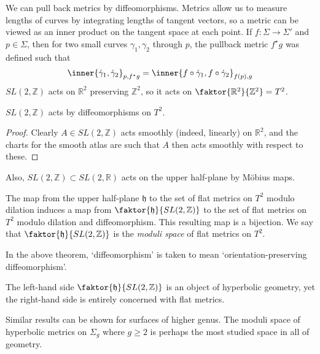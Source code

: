We can pull back metrics by diffeomorphisms.
Metrics allow us to measure lengths of curves by integrating lengths of tangent vectors, so a metric can be viewed as an inner product on the tangent space at each point.
If $f \colon \Sigma \to \Sigma'$ and $p \in \Sigma$, then for two small curves $\gamma_1, \gamma_2$ through $p$, the pullback metric $f^\star g$ was defined such that
\begin{align*}
	\inner{\dot \gamma_1, \dot \gamma_2}_{p, f^\star g} = \inner{f \circ \dot \gamma_1, f \circ \dot \gamma_2}_{f(p), g}
\end{align*}
$SL(2,\mathbb Z)$ acts on $\mathbb R^2$ preserving $\mathbb Z^2$, so it acts on $\faktor{\mathbb R^2}{\mathbb Z^2} = T^2$.
\begin{lemma}
	$SL(2,\mathbb Z)$ acts by diffeomorphisms on $T^2$.
\end{lemma}
\begin{proof}
	Clearly $A \in SL(2,\mathbb Z)$ acts smoothly (indeed, linearly) on $\mathbb R^2$, and the charts for the smooth atlas are such that $A$ then acts smoothly with respect to these.
\end{proof}
Also, $SL(2,\mathbb Z) \subset SL(2,\mathbb R)$ acts on the upper half-plane by M\"obius maps.
\begin{theorem}
	The map from the upper half-plane $\mathfrak{h}$ to the set of flat metrics on $T^2$ modulo dilation induces a map from $\faktor{\mathfrak{h}}{SL(2,\mathbb Z)}$ to the set of flat metrics on $T^2$ modulo dilation and diffeomorphism.
	This resulting map is a bijection.
	We say that $\faktor{\mathfrak{h}}{SL(2,\mathbb Z)}$ is the \textit{moduli space} of flat metrics on $T^2$.
\end{theorem}
In the above theorem, `diffeomorphism' is taken to mean `orientation-preserving diffeomorphism'.
\begin{remark}
	The left-hand side $\faktor{\mathfrak{h}}{SL(2,\mathbb Z)}$ is an object of hyperbolic geometry, yet the right-hand side is entirely concerned with flat metrics.

	Similar results can be shown for surfaces of higher genus.
	The moduli space of hyperbolic metrics on $\Sigma_g$ where $g \geq 2$ is perhaps the most studied space in all of geometry.
\end{remark}

